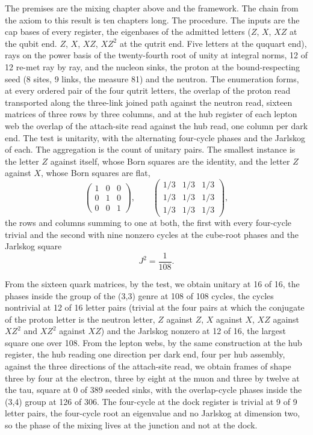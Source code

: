 \begin{chproof}
The premises are the mixing chapter above and the framework. The chain from the axiom to this result is ten chapters long. The procedure. The inputs are the cap bases of every register, the eigenbases of the admitted letters ($Z$, $X$, $XZ$ at the qubit end. $Z$, $X$, $XZ$, $XZ^{2}$ at the qutrit end. Five letters at the ququart end), rays on the power basis of the twenty-fourth root of unity at integral norms, 12 of 12 re-met ray by ray, and the nucleon sinks, the proton at the bound-respecting seed (8 sites, 9 links, the measure 81) and the neutron. The enumeration forms, at every ordered pair of the four qutrit letters, the overlap of the proton read transported along the three-link joined path against the neutron read, sixteen matrices of three rows by three columns, and at the hub register of each lepton web the overlap of the attach-site read against the hub read, one column per dark end. The test is unitarity, with the alternating four-cycle phases and the Jarlskog of each. The aggregation is the count of unitary pairs. The smallest instance is the letter $Z$ against itself, whose Born squares are the identity, and the letter $Z$ against $X$, whose Born squares are flat,
\begin{equation}
\begin{pmatrix} 1 & 0 & 0 \\ 0 & 1 & 0 \\ 0 & 0 & 1 \end{pmatrix}, \qquad \begin{pmatrix} 1/3 & 1/3 & 1/3 \\ 1/3 & 1/3 & 1/3 \\ 1/3 & 1/3 & 1/3 \end{pmatrix},
\end{equation}
the rows and columns summing to one at both, the first with every four-cycle trivial and the second with nine nonzero cycles at the cube-root phases and the Jarlskog square
\begin{equation}
J^{2} = \frac{1}{108} .
\end{equation}

From the sixteen quark matrices, by the test, we obtain unitary at 16 of 16, the phases inside the group of the (3,3) genre at 108 of 108 cycles, the cycles nontrivial at 12 of 16 letter pairs (trivial at the four pairs at which the conjugate of the proton letter is the neutron letter, $Z$ against $Z$, $X$ against $X$, $XZ$ against $XZ^{2}$ and $XZ^{2}$ against $XZ$) and the Jarlskog nonzero at 12 of 16, the largest square one over 108. From the lepton webs, by the same construction at the hub register, the hub reading one direction per dark end, four per hub assembly, against the three directions of the attach-site read, we obtain frames of shape three by four at the electron, three by eight at the muon and three by twelve at the tau, square at 0 of 389 seeded sinks, with the overlap-cycle phases inside the (3,4) group at 126 of 306. The four-cycle at the dock register is trivial at 9 of 9 letter pairs, the four-cycle root an eigenvalue and no Jarlskog at dimension two, so the phase of the mixing lives at the junction and not at the dock.


\end{chproof}
